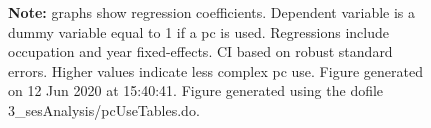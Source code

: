 \begin{figure}[!h]
\par \begin{minipage}[h]{\textwidth}{\scriptsize\textbf{Note:} graphs show regression coefficients. Dependent variable is a dummy variable equal to 1 if a pc is used. Regressions include occupation and year fixed-effects. CI based on robust standard errors. Higher values indicate less complex pc use. Figure generated on 12 Jun 2020 at 15:40:41. Figure generated using the dofile 3\_sesAnalysis/pcUseTables.do.}\end{minipage}
\end{figure}

